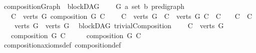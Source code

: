 \begin{isabellebody}
\isamarkupfalse%
\ compositionGraph\ {\isacharequal}{\kern0pt}\ blockDAG\ {\isacharplus}{\kern0pt}\isanewline
\ \ \ G{\isacharprime}{\kern0pt}\ {\isacharcolon}{\kern0pt}{\isacharcolon}{\kern0pt}{\isachardoublequoteopen}{\isacharparenleft}{\kern0pt}{\isacharprime}{\kern0pt}a\ set{\isacharcomma}{\kern0pt}\ {\isacharprime}{\kern0pt}b{\isacharparenright}{\kern0pt}\ pre{\isacharunderscore}{\kern0pt}digraph{\isachardoublequoteclose}\isanewline
\ \ \ {\isachardoublequoteopen}{\isasymforall}C\ {\isasymin}\ {\isacharparenleft}{\kern0pt}verts\ G{\isacharprime}{\kern0pt}{\isacharparenright}{\kern0pt}{\isachardot}{\kern0pt}\ composition\ G\ C{\isachardoublequoteclose}\isanewline
\ \ \ {\isachardoublequoteopen}{\isasymforall}\ C{}\ {\isasymin}\ {\isacharparenleft}{\kern0pt}verts\ G{\isacharprime}{\kern0pt}{\isacharparenright}{\kern0pt}{\isachardot}{\kern0pt}\ {\isasymforall}\ C{}\ {\isasymin}\ {\isacharparenleft}{\kern0pt}verts\ G{\isacharprime}{\kern0pt}{\isacharparenright}{\kern0pt}{\isachardot}{\kern0pt}\ C{}\ {\isasyminter}\ C{}\ {\isasymnoteq}\ {\isacharbraceleft}{\kern0pt}{\isacharbraceright}{\kern0pt}\ {\isasymlongrightarrow}\ C{}\ {\isacharequal}{\kern0pt}\ C{}{\isachardoublequoteclose}\isanewline
\ \ \ {\isachardoublequoteopen}{\isasymUnion}\ {\isacharparenleft}{\kern0pt}verts\ G{\isacharprime}{\kern0pt}{\isacharparenright}{\kern0pt}\ {\isacharequal}{\kern0pt}\ verts\ G{\isachardoublequoteclose}%
\isadelimdocument
%
\endisadelimdocument
%
\isatagdocument
%
\isamarkuptrue%
%
\isamarkuptrue%
%
\endisatagdocument
{\isafolddocument}%
%
\isadelimdocument
%
\endisadelimdocument
{}\isamarkupfalse%
\ {\isacharparenleft}{\kern0pt}\ blockDAG{\isacharparenright}{\kern0pt}\ trivialComposition{\isacharcolon}{\kern0pt}\ \isanewline
\ \ \ {\isachardoublequoteopen}C\ {\isacharequal}{\kern0pt}\ verts\ G{\isachardoublequoteclose}\isanewline
\ \ \ {\isachardoublequoteopen}composition\ G\ C{\isachardoublequoteclose}\isanewline
%
\isadelimproof
%
\endisadelimproof
%
\isatagproof
{}\isamarkupfalse%
\ {\isacharminus}{\kern0pt}\isanewline
\ \ \isamarkupfalse%
\ {\isachardoublequoteopen}composition\ G\ C{\isachardoublequoteclose}\isanewline
\ \ \ \ \isamarkupfalse%
\ composition{\isacharunderscore}{\kern0pt}axioms{\isacharunderscore}{\kern0pt}def\ composition{\isacharunderscore}{\kern0pt}def\isanewline

\end{isabellebody}
